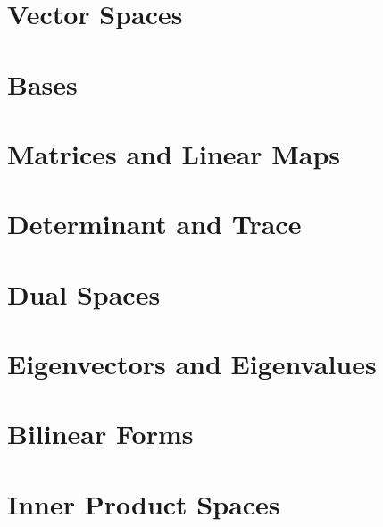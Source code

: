 \documentclass[british,11pt,a4paper]{report}
\begin{document}
\maketitle
\tableofcontents

\chapter{Vector Spaces}

\chapter{Bases}

\chapter{Matrices and Linear Maps}

\chapter{Determinant and Trace}

\chapter{Dual Spaces}

\chapter{Eigenvectors and Eigenvalues}

\chapter{Bilinear Forms}

\chapter{Inner Product Spaces}

\end{document}
